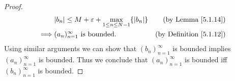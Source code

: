 \begin{proof}
\begin{align*}
                 & \abs{b_n} \leq M + \varepsilon + \max_{1 \leq n \leq N - 1}\{\abs{b_n}\}                     & \text{(by Lemma \ref{5.1.14})}            \\
        \implies & (a_n)_{n = 1}^\infty \text{ is bounded}.                                                     & \text{(by Definition \ref{5.1.12})}
    \end{align*}
    Using similar arguments we can show that \((b_n)_{n = 1}^\infty\) is bounded implies \((a_n)_{n = 1}^\infty\) is bounded.
    Thus we conclude that \((a_n)_{n = 1}^\infty\) is bounded iff \((b_n)_{n = 1}^\infty\) is bounded.
\end{proof}